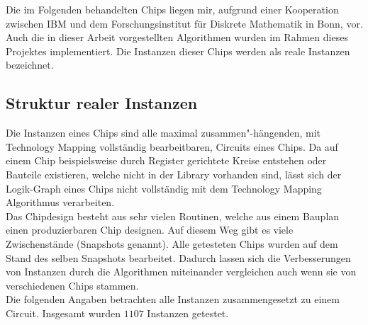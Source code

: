 \documentclass[11pt, a4paper, german]{article}
\newcommand{\TM}{Technology  Mapping }
\begin{document}
Die im Folgenden behandelten Chips liegen mir, aufgrund einer Kooperation zwischen IBM und dem Forschungsinstitut für Diskrete Mathematik in Bonn, vor. Auch die in dieser Arbeit vorgestellten Algorithmen wurden im Rahmen dieses Projektes implementiert. Die Instanzen dieser Chips werden als reale Instanzen bezeichnet.

 \subsection{Struktur realer Instanzen}
\label{subsec:struktur_realer_instanzen} 
Die Instanzen eines Chips sind alle maximal zusammen"-h\"angen\-den, mit \TM vollständig bearbeitbaren, Circuits eines Chips. Da auf einem Chip beispielsweise durch Register gerichtete Kreise entstehen oder Bauteile existieren, welche nicht in der Library vorhanden sind, lässt sich der Logik-Graph eines Chips nicht vollständig mit dem \TM Algorithmus verarbeiten. \\
 Das Chipdesign besteht aus sehr vielen Routinen, welche aus einem Bauplan einen produzierbaren Chip designen. Auf diesem Weg gibt es viele Zwischenstände (Snapshots genannt). Alle getesteten Chips wurden auf dem Stand  des selben Snapshots bearbeitet. Dadurch lassen sich die Verbesserungen von Instanzen durch die Algorithmen miteinander vergleichen auch wenn sie von verschiedenen Chips stammen.\\
 Die folgenden Angaben betrachten alle Instanzen zusammengesetzt zu einem Circuit.
 Insgesamt wurden $1107$ Instanzen getestet. \\
\end{document}
